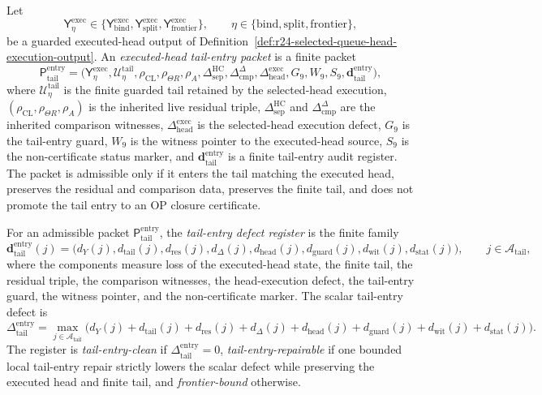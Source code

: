 \begin{definition}
\label{def:executed-head-tail-entry-packet}
Let
\[
 \mathsf Y_{\eta}^{\mathrm{exec}}
 \in
 \{\mathsf Y_{\mathrm{bind}}^{\mathrm{exec}},
 \mathsf Y_{\mathrm{split}}^{\mathrm{exec}},
 \mathsf Y_{\mathrm{frontier}}^{\mathrm{exec}}\},
 \qquad
 \eta\in\{\mathrm{bind},\mathrm{split},\mathrm{frontier}\},
\]
be a guarded executed-head output of Definition~\ref{def:r24-selected-queue-head-execution-output}. An \emph{executed-head tail-entry packet} is a finite packet
\[
 \mathsf P_{\mathrm{tail}}^{\mathrm{entry}}
 =
 \bigl(
 \mathsf Y_{\eta}^{\mathrm{exec}},
 \mathcal U_{\eta}^{\mathrm{tail}},
 \rho_{\mathrm{CL}},\rho_{\Theta R},\rho_A,
 \Delta_{\mathrm{sep}}^{\mathrm{HC}},
 \Delta_{\mathrm{cmp}}^{\Delta},
 \Delta_{\mathrm{head}}^{\mathrm{exec}},
 G_9,W_9,S_9,
 \mathbf d_{\mathrm{tail}}^{\mathrm{entry}}
 \bigr),
\]
where \(\mathcal U_{\eta}^{\mathrm{tail}}\) is the finite guarded tail retained by the selected-head execution, \((\rho_{\mathrm{CL}},\rho_{\Theta R},\rho_A)\) is the inherited live residual triple, \(\Delta_{\mathrm{sep}}^{\mathrm{HC}}\) and \(\Delta_{\mathrm{cmp}}^{\Delta}\) are the inherited comparison witnesses, \(\Delta_{\mathrm{head}}^{\mathrm{exec}}\) is the selected-head execution defect, \(G_9\) is the tail-entry guard, \(W_9\) is the witness pointer to the executed-head source, \(S_9\) is the non-certificate status marker, and \(\mathbf d_{\mathrm{tail}}^{\mathrm{entry}}\) is a finite tail-entry audit register. The packet is admissible only if it enters the tail matching the executed head, preserves the residual and comparison data, preserves the finite tail, and does not promote the tail entry to an OP closure certificate.
\end{definition}

\begin{definition}
\label{def:executed-head-tail-entry-defect}
For an admissible packet \(\mathsf P_{\mathrm{tail}}^{\mathrm{entry}}\), the \emph{tail-entry defect register} is the finite family
\[
 \mathbf d_{\mathrm{tail}}^{\mathrm{entry}}(j)
 =
 \bigl(d_Y(j),d_{\mathrm{tail}}(j),d_{\mathrm{res}}(j),d_{\Delta}(j),
 d_{\mathrm{head}}(j),d_{\mathrm{guard}}(j),d_{\mathrm{wit}}(j),d_{\mathrm{stat}}(j)\bigr),
 \qquad j\in\mathcal A_{\mathrm{tail}},
\]
where the components measure loss of the executed-head state, the finite tail, the residual triple, the comparison witnesses, the head-execution defect, the tail-entry guard, the witness pointer, and the non-certificate marker. The scalar tail-entry defect is
\[
 \Delta_{\mathrm{tail}}^{\mathrm{entry}}
 =
 \max_{j\in\mathcal A_{\mathrm{tail}}}
 \bigl(d_Y(j)+d_{\mathrm{tail}}(j)+d_{\mathrm{res}}(j)+d_{\Delta}(j)+d_{\mathrm{head}}(j)
 +d_{\mathrm{guard}}(j)+d_{\mathrm{wit}}(j)+d_{\mathrm{stat}}(j)\bigr).
\]
The register is \emph{tail-entry-clean} if \(\Delta_{\mathrm{tail}}^{\mathrm{entry}}=0\), \emph{tail-entry-repairable} if one bounded local tail-entry repair strictly lowers the scalar defect while preserving the executed head and finite tail, and \emph{frontier-bound} otherwise.
\end{definition}

